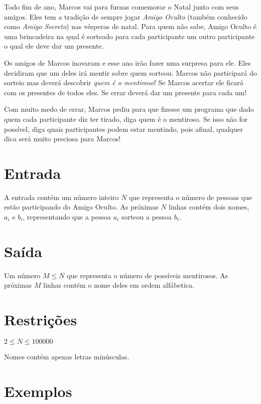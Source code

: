 Todo fim de ano, Marcos vai para furnas comemorar o Natal junto com seus amigos.
Eles tem a tradição de sempre jogar \textit{Amigo Oculto} (também conhecido como 
\textit{Amigo Secreto}) nas vésperas de natal. Para quem não sabe, Amigo Oculto
é uma brincadeira na qual é sorteado para cada participante um outro participante
o qual ele deve dar um presente. 

Os amigos de Marcos inovaram e esse ano irão fazer uma surpresa para ele. Eles decidiram
que um deles irá mentir sobre quem sorteou. Marcos não participará do sorteio mas
deverá descobrir \textit{quem é o mentiroso}! Se Marcos acertar ele ficará com os
presentes de todos eles. Se errar deverá dar um presente para cada um! 

Com muito medo de errar, Marcos pediu para que fizesse um programa que dado quem
cada participante diz ter tirado, diga quem é o mentiroso. Se isso não for possível,
diga quais participantes podem estar mentindo, pois afinal, qualquer dica será
muito preciosa para Marcos!

\section*{Entrada}

A entrada contém um número inteiro $N$ que representa o número de pessoas que estão
participando do Amigo Oculto. As próximas $N$ linhas contém dois nomes, $a_i$ e $b_i$,
representando que a pessoa $a_i$ sorteou a pessoa $b_i$.

\section*{Saída}

Um número $M \le N$ que representa o número de possíveis mentirosos. As próximas $M$ linhas
contém o nome deles em ordem alfábetica.

\section*{Restrições}

$2 \le N \le 100000$

Nomes contém apenas letras minúsculas. 

\section*{Exemplos}

\begin{example}
%
\end{example}
